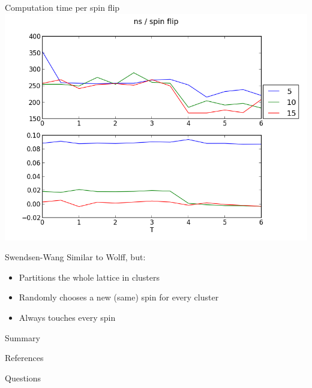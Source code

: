 \documentclass[handout]{beamer}
\begin{document}
\begin{frame}{Computation time per spin flip}
\includegraphics[width=\textwidth]{../results/measurements/nsPerSpinFlip.png}
\note{ }
\end{frame}

\begin{frame}{Swendsen-Wang}
Similar to Wolff, but:
\begin{itemize}
\item<2-> Partitions the whole lattice in clusters
\item<3-> Randomly chooses a new (same) spin for every cluster
\item<4-> Always touches every spin
\end{itemize}
\note{ }
\end{frame}

\begin{frame}{Summary}
\note{ }
\end{frame}

\begin{frame}{References}
\note{ }
\end{frame}

\begin{frame}
\centerline{\huge{Questions}}
\note{ }
\end{frame}
\end{document}
